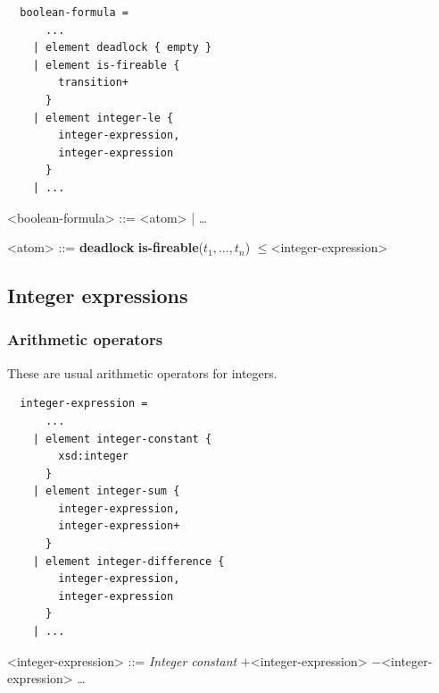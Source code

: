 \documentclass[10pt,english,a4paper]{article}
\newcommand\atomleq          {\boldmath$\leq$\xspace}
\newcommand\atomdead         {\textbf{deadlock}\xspace}
\newcommand\atomisfire[1]    {\textbf{is-fireable}(#1)}
\newcommand\exprplus         {\boldmath$+$\xspace}
\newcommand\exprminus        {\boldmath$-$\xspace}
\newcommand\mysubsection[1]{\color{sectioncolor}\subsection{#1}\color{defaultcolor}}
\begin{document}
\begin{multicols}{2}
\begin{lstlisting}
  boolean-formula =
      ...
    | element deadlock { empty }
    | element is-fireable {
        transition+
      }
    | element integer-le {
        integer-expression,
        integer-expression
      }
    | ...
\end{lstlisting}
\columnbreak
\setlength{\grammarindent}{6em}
\begin{grammar}
<boolean-formula> ::= <atom> | \ldots

<atom> ::= \atomdead
\alt \atomisfire{$t_1, \ldots, t_n$}
 \atomleq <integer-expression>
\end{grammar}
\end{multicols}


\mysubsection{Integer expressions}




\subsubsection{Arithmetic operators}

These are usual arithmetic operators for integers.

\begin{multicols}{2}
\begin{lstlisting}
  integer-expression =
      ...
    | element integer-constant {
        xsd:integer
      }
    | element integer-sum {
        integer-expression,
        integer-expression+
      }
    | element integer-difference {
        integer-expression,
        integer-expression
      }
    | ...
\end{lstlisting}
\columnbreak
\setlength{\grammarindent}{6em}
\begin{grammar}
<integer-expression> ::=
     \textit{Integer constant}
 \exprplus <integer-expression>
 \exprminus <integer-expression>
\alt \ldots
\end{grammar}
\end{multicols}
\end{document}
